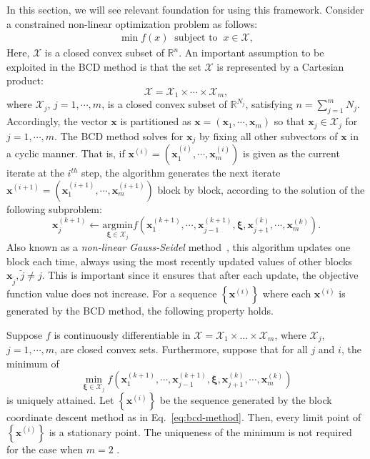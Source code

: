 In this section, we will see relevant foundation for using  this
framework.  Consider a constrained non-linear optimization problem
as follows:
\begin{gather}
\min f(x)\:\mbox{ subject to }\:x \in\mathcal{X},\label{eq:general_nonlinear}
\end{gather}
Here,  $\mathcal{X}$ is a closed convex subset of $\mathbb{R}^{n}$.
An important assumption to be exploited in the BCD method is that
the set $\mathcal{X}$ is represented by a Cartesian product:
\begin{equation}
\mathcal{X}=\mathcal{X}_{1}\times\cdots\times\mathcal{X}_{m},\label{eq:bcd-cartesian-product}
\end{equation}
where $\mathcal{X}_{j}$, $j=1,\cdots,m$, is a closed convex subset
of $\mathbb{R}^{N_{j}}$, satisfying $n=\sum_{j=1}^{m}N_{j}$.
Accordingly, the vector $\mathbf{x}$ is partitioned as
$\mathbf{x}=(\mathbf{x}_{1},\cdots,\mathbf{x}_{m})$ so that
$\mathbf{x}_{j}\in\mathcal{X}_{j}$ for $j=1,\cdots,m$. The BCD
method solves for $\mathbf{x}_{j}$ by fixing all other subvectors of
$\mathbf{x}$ in a cyclic manner. That is, if
$\mathbf{x}^{(i)}=(\mathbf{x}_{1}^{(i)},\cdots,\mathbf{x}_{m}^{(i)})$
is given as the current iterate at the $i^{th}$ step, the algorithm
generates the next iterate
$\mathbf{x}^{(i+1)}=(\mathbf{x}_{1}^{(i+1)},\cdots,\mathbf{x}_{m}^{(i+1)})$
block by block, according to the solution of the following
subproblem:
\begin{equation}
\mathbf{x}_{j}^{(k+1)}\leftarrow\underset{\mathbf{\xi}\in\mathcal{X}_{j}}{\text{argmin}}
f(\mathbf{x}_{1}^{(k+1)},\cdots,\mathbf{x}_{j-1}^{(k+1)},\mathbf{\xi},\mathbf{x}_{j+1}^{(k)},\cdots,\mathbf{x}_{m}^{(k)}).\label{eq:bcd-method}
\end{equation}
Also known as a \textit{non-linear Gauss-Seidel}
method~\cite{Bertsekas1999}, this algorithm updates one block each
time, always using the most recently updated values of other blocks
$\mathbf{x}_{\tilde{j}},\tilde{j}\ne j$. This is important since it
ensures that after each update, the objective function value does
not increase. For a sequence $\left\lbrace
\mathbf{x}^{(i)}\right\rbrace $ where each $\mathbf{x}^{(i)}$ is
generated by the BCD method, the following property holds.
\begin{thm}
\label{thm:bcd}
Suppose $f$ is continuously differentiable in $\mathcal{X}=\mathcal{X}_{1}\times\dots\times\mathcal{X}_{m}$,
where $\mathcal{X}_{j}$, $j=1,\cdots,m$, are closed convex sets.
Furthermore, suppose that for all $j$ and $i$, the minimum of
\[
\min_{\mathbf{\mathbf{\xi}}\in\mathcal{X}_{j}}f(\mathbf{x}_{1}^{(k+1)},\cdots,\mathbf{x}_{j-1}^{(k+1)},\mathbf{\xi},\mathbf{x}_{j+1}^{(k)},\cdots,\mathbf{x}_{m}^{(k)})
\]
is uniquely attained. Let $\left\lbrace
\mathbf{x}^{(i)}\right\rbrace $ be the sequence generated by the
block coordinate descent method as in Eq.~\eqref{eq:bcd-method}.
Then, every limit point of $\left\lbrace
\mathbf{x}^{(i)}\right\rbrace $ is a stationary point. The
uniqueness of the minimum is not required for the case when  $m=2$
\cite{Grippo2000}.
\end{thm}

